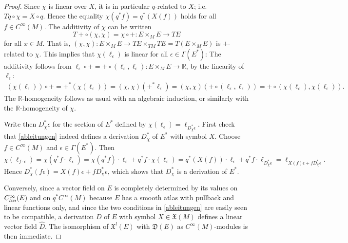 \documentclass{amsart}
\theoremstyle{plain}
\newcommand{\lie}[1]{\mathfrak{#1}}
\newcommand{\mx}{\mathfrak{X}}
\begin{document}
\begin{proof}
Since $\chi$ is linear over $X$, it is in particular $q$-related to $X$; i.e.~$Tq\circ \chi=X\circ q$.
Hence the equality $ \chi(q^*f)= q^*(X(f))$ holds for all $f\in C^\infty(M)$. The additivity of $\chi$ can be written 
\[ T\!\!+\circ(\chi, \chi)=\chi\circ +\colon E\times_M E\to TE
\]
for all $x\in M$. That is, $(\chi,\chi)\colon E\times_ME\to TE\times_{TM}TE=T(E\times_ME)$ is $+$-related to $\chi$.
This implies that $\chi(\ell_\epsilon)$ is linear for all $\epsilon\in\Gamma(E^*)$: The additivity follows from $\ell_\epsilon\circ +=+\circ (\ell_\epsilon, \ell_\epsilon)\colon E\times_M E\to \mathbb R$, by the linearity of $\ell_\epsilon$:
\begin{equation*}
\begin{split}
(\chi(\ell_\epsilon))\circ +=+^*(\chi(\ell_\epsilon))=(\chi, \chi)(+^*\ell_\epsilon)=(\chi,\chi)(+\circ (\ell_\epsilon, \ell_\epsilon))=+\circ (\chi(\ell_\epsilon), \chi(\ell_\epsilon)).
\end{split}
\end{equation*}
The $\mathbb R$-homogeneity follows as usual with an algebraic induction, or similarly with the $\mathbb R$-homogeneity of $\chi$.

Write then  $D^*_\chi\epsilon$ for the section of $E^*$ defined by $\chi(\ell_\epsilon)=\ell_{D^*_\chi\epsilon}$.
First check that \eqref{ableitungen} indeed defines a derivation $D_\chi^*$ of $E^*$ with symbol $X$.
Choose $f\in C^\infty(M)$ and $\epsilon\in\Gamma(E^*)$.
Then 
\[ \chi(\ell_{f\cdot\epsilon})=\chi(q^*f\cdot \ell_\epsilon)=\chi(q^* f)\cdot \ell_\epsilon+q^*f\cdot \chi(\ell_\epsilon)=q^*(X(f))\cdot \ell_\epsilon+q^*f\cdot \ell_{D^*_\chi\epsilon}=
\ell_{X(f)\epsilon+fD^*_\chi\epsilon}.
\]
Hence $D^*_\chi(f\epsilon)=X(f)\epsilon+fD^*_\chi\epsilon$, which shows that $D^*_\chi$ is a derivation of $E^*$.

Conversely, since a vector field on $E$ is completely determined by its values on $C^\infty_{\rm lin}(E)$ and on $q^*C^\infty(M)$ because $E$ has a smooth atlas with pullback and linear functions only, and since the two conditions in \eqref{ableitungen} are easily seen to be compatible, a derivation $D$ of $E$ with symbol $X\in\mx(M)$ defines a linear vector field $\widehat D$. The isomorphism of $\mx^l(E)$ with $\lie D(E)$ as $C^\infty(M)$-modules is then immediate.
\end{proof}
\end{document}
